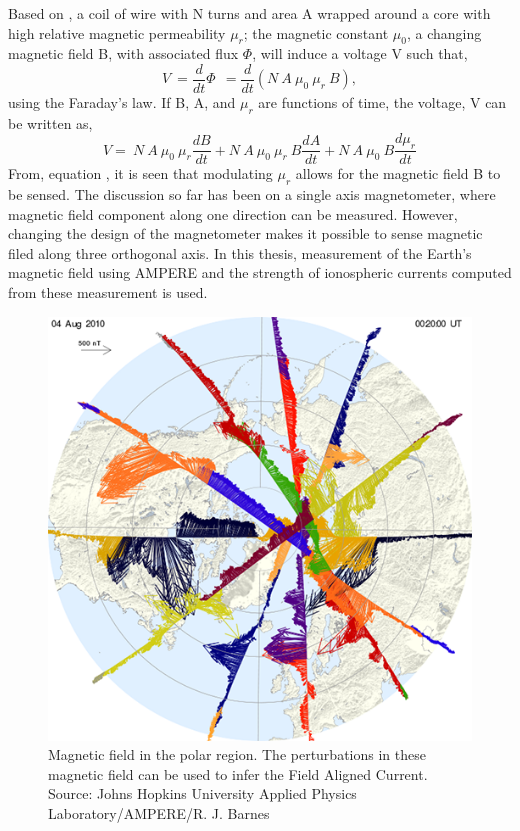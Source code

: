 \documentclass[crop=false,class=mitthesis,oneside,font=12pt]{standalone}
\begin{document}
Based on \citep{ripka2001magnetic}, a coil of wire with N turns and area A wrapped around a core with high relative magnetic permeability $\mu_r$; the magnetic constant $\mu_0$, a changing magnetic field B, with associated flux $\Phi$, will induce a voltage V such that,
\begin{equation*}
V~= \frac{d}{dt}\Phi~~=\frac{d}{dt}(N~A~\mu_{0}~\mu_{r}~B),
\end{equation*}using the Faraday's law. If B, A, and $\mu_r$ are functions of time, the voltage, V can be written as,
\begin{equation}
V=~N~A~\mu_{0}~\mu_{r}\frac{dB}{dt}+N~A~\mu_{0}~\mu_{r}~B\frac{dA}{dt}+N~A~\mu_{0}~B\frac{d\mu_{r}}{dt}
\end{equation}
From, equation \theequation, it is seen that modulating $\mu_r$ allows for the magnetic field B to be sensed. The discussion so far has been on a single axis magnetometer, where magnetic field component along one direction can be measured. However, changing the design of the magnetometer makes it possible to sense magnetic filed along three orthogonal axis. In this thesis, measurement of the Earth's magnetic field using AMPERE and the strength of ionospheric currents computed from these measurement is used.
\begin{figure}[H]
	\centering\includegraphics[width=30pc]{fac_s.png}
	\caption{Magnetic field in the polar region. The perturbations in these magnetic field can be used to infer the Field Aligned Current. Source: Johns Hopkins University Applied Physics Laboratory/AMPERE/R. J. Barnes}
	\label{fig:fac_s}
\end{figure}
\end{document}
